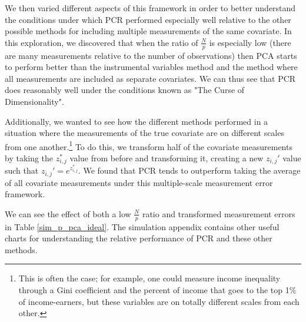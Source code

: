 \documentclass[10pt]{article}
\begin{document}
        We then varied different aspects of this framework in order to better understand the conditions under which PCR performed especially well relative to the other possible methods for including multiple measurements of the same covariate. In this exploration, we discovered that when the ratio of $\frac{N}{p}$ is especially low (there are many measurements relative to the number of observations) then PCA starts to perform better than the instrumental variables method and the method where all measurements are included as separate covariates. We can thus see that PCR does reasonably well under the conditions known as "The Curse of Dimensionality".

        Additionally, we wanted to see how the different methods performed in a situation where the measurements of the true covariate are on different scales from one another.\footnote{This is often the case; for example, one could measure income inequality through a Gini coefficient and the percent of income that goes to the top 1\% of income-earners, but these variables are on totally different scales from each other.} To do this, we transform half of the covariate measurements by taking the $z_{i,j}^*$ value from before and transforming it, creating a new $z_{i,j}'$ value such that $z_{i,j}' = e^{z_{i,j}^*}$. We found that PCR tends to outperform taking the average of all covariate measurements under this multiple-scale measurement error framework. 
        
        We can see the effect of both a low $\frac{N}{p}$ ratio and transformed measurement errors in Table \ref{sim_p_pca_ideal}. The simulation appendix contains other useful charts for understanding the relative performance of PCR and these other methods.

        \begin{table}[!htbp] \centering
            \caption{Average Coefficients for Values of $p$ ($N=100$, Exponential Transformation) \label{sim_p_pca_ideal}}
        \end{table}
\end{document}
